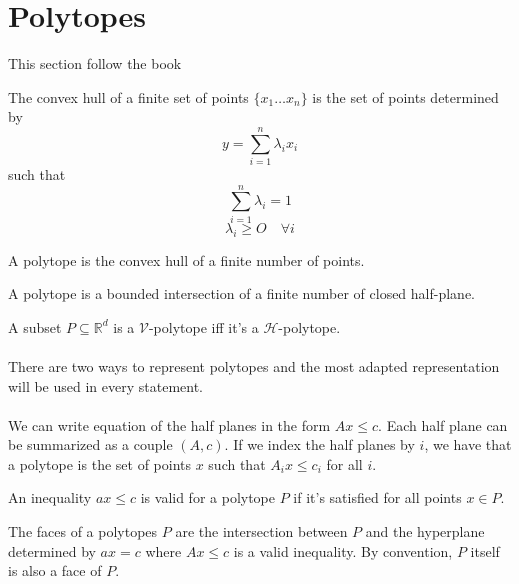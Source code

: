 \section{Polytopes}

This section follow the book \cite{polytopes}

\begin{definition}
  The convex hull of a finite set of points $\{x_1 \dots x_n\}$ is the set of points determined by
  \[
    y = \sum_{i=1}^n \lambda_i x_i
  \]
  such that
  \[
    \sum_{i=1}^n \lambda_i = 1
  \]
  \[
    \lambda_i \ge O \quad \forall i
  \]
\end{definition}

\begin{definition}
  A polytope is the convex hull of a finite number of points.
\end{definition}

\begin{definition}
  A polytope is a bounded intersection of a finite number of closed half-plane.
\end{definition}

\begin{theorem}
  A subset $P \subseteq \mathbb R^d$ is a $\mathcal V$-polytope iff it's a $\mathcal H$-polytope.
\end{theorem}

\paragraph{}
There are two ways to represent polytopes and the most adapted representation will be used in every statement.

\paragraph{}
We can write equation of the half planes in the form $Ax \le c$. Each half plane can be summarized as a couple $(A,c)$. If we index the half planes by $i$, we have that a polytope is the set of points $x$ such that $A_i x \le c_i$ for all $i$.

\begin{definition}
  An inequality $ax \le c$ is valid for a polytope $P$ if it's satisfied for all points $x \in P$.
\end{definition}

\begin{definition}
  The faces of a polytopes $P$ are the intersection between $P$ and the hyperplane determined by $ax = c$ where $Ax \le c$ is a valid inequality. By convention, $P$ itself is also a face of $P$.
\end{definition}

